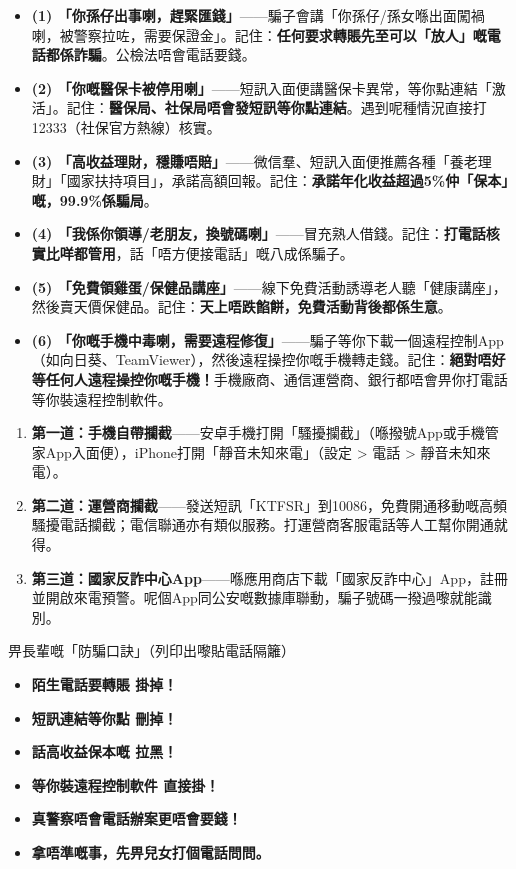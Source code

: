 \begin{itemize}
  \item \textbf{(1) 「你孫仔出事喇，趕緊匯錢」}——騙子會講「你孫仔/孫女喺出面闖禍喇，被警察拉咗，需要保證金」。記住：\textbf{任何要求轉賬先至可以「放人」嘅電話都係詐騙}。公檢法唔會電話要錢。
  \item \textbf{(2) 「你嘅醫保卡被停用喇」}——短訊入面便講醫保卡異常，等你點連結「激活」。記住：\textbf{醫保局、社保局唔會發短訊等你點連結}。遇到呢種情況直接打12333（社保官方熱線）核實。
  \item \textbf{(3) 「高收益理財，穩賺唔賠」}——微信羣、短訊入面便推薦各種「養老理財」「國家扶持項目」，承諾高額回報。記住：\textbf{承諾年化收益超過5\%仲「保本」嘅，99.9\%係騙局}。
  \item \textbf{(4) 「我係你領導/老朋友，換號碼喇」}——冒充熟人借錢。記住：\textbf{打電話核實比咩都管用}，話「唔方便接電話」嘅八成係騙子。
  \item \textbf{(5) 「免費領雞蛋/保健品講座」}——線下免費活動誘導老人聽「健康講座」，然後賣天價保健品。記住：\textbf{天上唔跌餡餅，免費活動背後都係生意}。
  \item \textbf{(6) 「你嘅手機中毒喇，需要遠程修復」}——騙子等你下載一個遠程控制App（如向日葵、TeamViewer），然後遠程操控你嘅手機轉走錢。記住：\textbf{絕對唔好等任何人遠程操控你嘅手機！}手機廠商、通信運營商、銀行都唔會畀你打電話等你裝遠程控制軟件。
\end{itemize}


\begin{enumerate}
  \item \textbf{第一道：手機自帶攔截}——安卓手機打開「騷擾攔截」（喺撥號App或手機管家App入面便），iPhone打開「靜音未知來電」（設定 > 電話 > 靜音未知來電）。
  \item \textbf{第二道：運營商攔截}——發送短訊「KTFSR」到10086，免費開通移動嘅高頻騷擾電話攔截；電信聯通亦有類似服務。打運營商客服電話等人工幫你開通就得。
  \item \textbf{第三道：國家反詐中心App}——喺應用商店下載「國家反詐中心」App，註冊並開啟來電預警。呢個App同公安嘅數據庫聯動，騙子號碼一撥過嚟就能識別。
\end{enumerate}

\begin{tcbwarn}{畀長輩嘅「防騙口訣」（列印出嚟貼電話隔籬）}
\begin{itemize}
  \item \textbf{陌生電話要轉賬 掛掉！}
  \item \textbf{短訊連結等你點 刪掉！}
  \item \textbf{話高收益保本嘅 拉黑！}
  \item \textbf{等你裝遠程控制軟件 直接掛！}
  \item \textbf{真警察唔會電話辦案更唔會要錢！}
  \item \textbf{拿唔準嘅事，先畀兒女打個電話問問。}
\end{itemize}

\end{tcbwarn}

